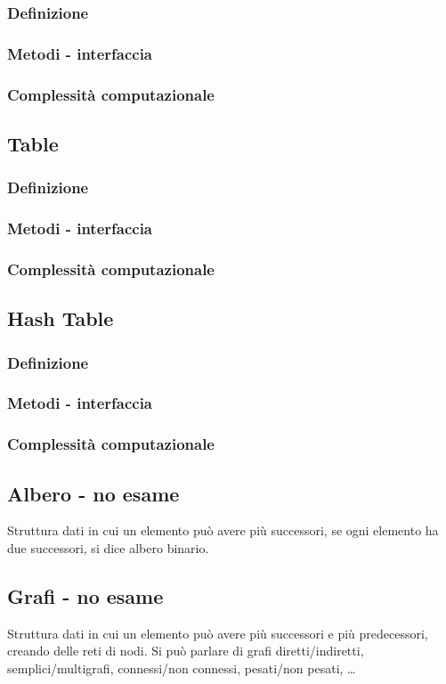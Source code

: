 \documentclass[a4paper]{article}
\begin{document}
\subsubsection*{Definizione}
\subsubsection*{Metodi - interfaccia}
\subsubsection*{Complessità computazionale}

\subsection{Table}
\subsubsection*{Definizione}
\subsubsection*{Metodi - interfaccia}
\subsubsection*{Complessità computazionale}

\subsection{Hash Table}
\subsubsection*{Definizione}
\subsubsection*{Metodi - interfaccia}
\subsubsection*{Complessità computazionale}

\newpage

\subsection{Albero - no esame}
Struttura dati in cui un elemento può avere più successori, se ogni elemento ha due successori, si dice albero binario.

\subsection{Grafi - no esame}
Struttura dati in cui un elemento può avere più successori e più predecessori, creando delle reti di nodi.
Si può parlare di grafi diretti/indiretti, semplici/multigrafi, connessi/non connessi, pesati/non pesati, \dots
\end{document}
